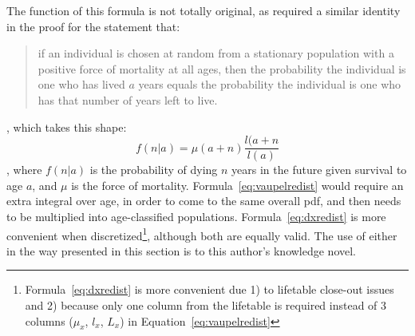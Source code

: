 The function of this formula is not totally original, as \citet{vaupel2009life}
required a similar identity in the proof for the statement that:
\begin{quotation}
if an individual is chosen at random from a stationary population with a positive force
of mortality at all ages, then the probability the individual is one who has lived $a$ years
equals the probability the individual is one who has that number of years left to live.
\end{quotation}
, which takes this shape:
\begin{equation}
\label{eq:vaupelredist}
f(n | a) = \mu (a+n) \frac{l(a+n}{l(a)}
\end{equation}
, where $f(n | a) $ is the probability of dying $n$ years in the future given
survival to age $a$, and $\mu$ is the force of mortality.
Formula~\eqref{eq:vaupelredist} would require an
extra integral over age, in order to come to the same
overall pdf, and then needs to be multiplied into
age-classified populations. Formula~\eqref{eq:dxredist} is more convenient when
discretized\footnote{Formula~\eqref{eq:dxredist} is more convenient due 1) to
lifetable close-out issues and 2) because only one column from the lifetable is
required instead of 3 columns ($\mu_x$, $l_x$, $L_x$) in
Equation~\eqref{eq:vaupelredist} }, although both are equally valid. The use of either
 in the way presented in this section is to this author's knowledge novel.

